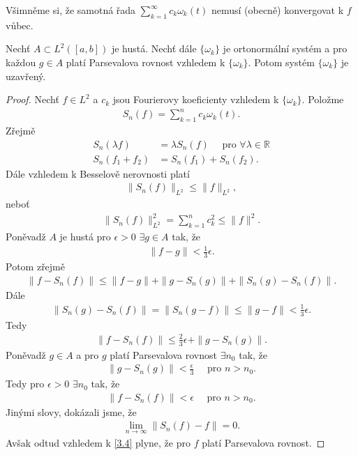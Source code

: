 \begin{poznamka}\label{3.21.poznamka}
Všimněme si, že samotná řada $\sum \limits _{k=1}^\infty c_k \omega_k (t)$ nemusí (obecně) konvergovat k $f$ vůbec.
\end{poznamka}

\begin{theorem}\label{3.22}
Nechť $A \subset L^2 ([a,b])$ je hustá. Nechť dále $\{ \omega_k \}$ je ortonormální systém a pro každou $g \in A$ platí Parsevalova rovnost vzhledem k $\{ \omega_k \}$. Potom systém $\{ \omega_k \}$ je uzavřený.
\end{theorem}
\begin{proof}
Nechť $f \in L^2$ a $c_k$ jsou Fourierovy koeficienty vzhledem k $\{ \omega_k \}$. Položme
\begin{align*}
S_n(f) = \sum \limits _{k=1}^n c_k \omega_k (t).
\end{align*}
Zřejmě
\begin{align*}
S_n (\lambda f) &= \lambda S_n (f) \quad \textrm{ pro } \forall \lambda \in \mathbb{R}\\
S_n (f_1 + f_2) &= S_n (f_1) + S_n (f_2).
\end{align*}
Dále vzhledem k Besselově nerovnosti platí
\begin{align*}
\|S_n(f)\|_{L^2} \leq \|f\|_{L^2},
\end{align*}
neboť
\begin{align*}
\|S_n(f)\|_{L^2}^2 = \sum \limits _{k=1}^n c_k^2 \leq \|f\|^2.
\end{align*}
Poněvadž $A$ je hustá pro $\epsilon > 0$ $\exists g \in A$ tak, že
\begin{align*}
\|f - g\| < \frac{1}{3} \epsilon.
\end{align*}
Potom zřejmě
\begin{align*}
\|f - S_n(f)\| \leq \|f - g\| + \|g - S_n(g)\| + \|S_n(g) - S_n(f)\|.
\end{align*}
Dále
\begin{align*}
\|S_n(g) - S_n(f)\| = \|S_n (g-f)\| \leq \|g-f\| < \frac{1}{3} \epsilon.
\end{align*}
Tedy
\begin{align*}
\|f - S_n(f)\| \leq \frac{2}{3} \epsilon + \|g - S_n(g)\|.
\end{align*}
Poněvadž $g \in A$ a pro $g$ platí Parsevalova rovnost $\exists n_0$ tak, že
\begin{align*}
\|g - S_n(g)\| < \frac{\epsilon}{3} \quad \textrm{ pro } n > n_0.
\end{align*}
Tedy pro $\epsilon > 0$ $\exists n_0$ tak, že
\begin{align*}
\|f - S_n(f)\| < \epsilon \quad \textrm{ pro } n > n_0.
\end{align*}
Jinými slovy, dokázali jsme, že
\begin{align*}
\lim_{n \rightarrow \infty} \|S_n(f) - f\| = 0.
\end{align*}
Avšak odtud vzhledem k \ref{3.4} plyne, že pro $f$ platí Parsevalova rovnost.
\end{proof}


